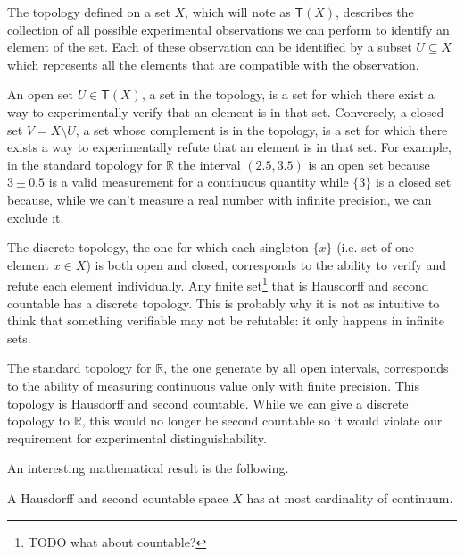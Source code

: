\documentclass[11pt,letterpaper,fleqn]{memoir} %
\begin{document}
The topology defined on a set $X$, which will note as $\mathsf{T}(X)$, describes the collection of all possible experimental observations we can perform to identify an element of the set. Each of these observation can be identified by a subset $U \subseteq X$ which represents all the elements that are compatible with the observation.

An open set $U \in \mathsf{T}(X)$, a set in the topology, is a set for which there exist a way to  experimentally verify that an element is in that set. Conversely, a closed set $V = X \setminus U $, a set whose complement is in the topology, is a set for which there exists a way to experimentally refute that an element is in that set. For example, in the standard topology for $\mathbb{R}$ the interval $(2.5, 3.5)$ is an open set because $3 \pm 0.5$ is a valid measurement for a continuous quantity while $\{3\}$ is a closed set because, while we can't measure a real number with infinite precision, we can exclude it.

The discrete topology, the one for which each singleton $\{x\}$ (i.e. set of one element $x \in X$) is both open and closed, corresponds to the ability to verify and refute each element individually. Any finite set\footnote{TODO what about countable?} that is Hausdorff and second countable has a discrete topology. This is probably why it is not as intuitive to think that something verifiable may not be refutable: it only happens in infinite sets.

The standard topology for $\mathbb{R}$, the one generate by all open intervals, corresponds to the ability of measuring continuous value only with finite precision. This topology is Hausdorff and second countable. While we can give a discrete topology to $\mathbb{R}$, this would no longer be second countable so it would violate our requirement for experimental distinguishability.

An interesting mathematical result is the following.

\begin{prop}
	A Hausdorff and second countable space $X$ has at most cardinality of continuum.
\end{prop}
\end{document}
